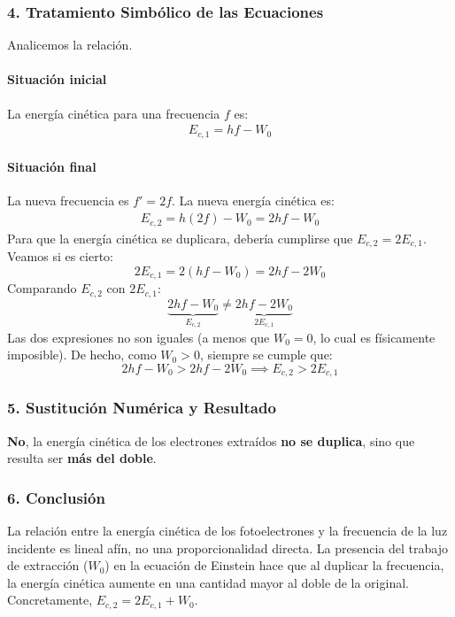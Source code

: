 \subsubsection*{4. Tratamiento Simbólico de las Ecuaciones}
Analicemos la relación.
\paragraph{Situación inicial}
La energía cinética para una frecuencia $f$ es:
\begin{gather}
    E_{c,1} = hf - W_0
\end{gather}
\paragraph{Situación final}
La nueva frecuencia es $f' = 2f$. La nueva energía cinética es:
\begin{gather}
    E_{c,2} = h(2f) - W_0 = 2hf - W_0
\end{gather}
Para que la energía cinética se duplicara, debería cumplirse que $E_{c,2} = 2 E_{c,1}$. Veamos si es cierto:
$$ 2 E_{c,1} = 2(hf - W_0) = 2hf - 2W_0 $$
Comparando $E_{c,2}$ con $2E_{c,1}$:
$$ \underbrace{2hf - W_0}_{E_{c,2}} \neq \underbrace{2hf - 2W_0}_{2E_{c,1}} $$
Las dos expresiones no son iguales (a menos que $W_0=0$, lo cual es físicamente imposible). De hecho, como $W_0 > 0$, siempre se cumple que:
$$ 2hf - W_0 > 2hf - 2W_0 \implies E_{c,2} > 2E_{c,1} $$

\subsubsection*{5. Sustitución Numérica y Resultado}
\begin{cajaresultado}
\textbf{No}, la energía cinética de los electrones extraídos \textbf{no se duplica}, sino que resulta ser \textbf{más del doble}.
\end{cajaresultado}

\subsubsection*{6. Conclusión}
\begin{cajaconclusion}
La relación entre la energía cinética de los fotoelectrones y la frecuencia de la luz incidente es lineal afín, no una proporcionalidad directa. La presencia del trabajo de extracción ($W_0$) en la ecuación de Einstein hace que al duplicar la frecuencia, la energía cinética aumente en una cantidad mayor al doble de la original. Concretamente, $E_{c,2} = 2E_{c,1} + W_0$.
\end{cajaconclusion}


